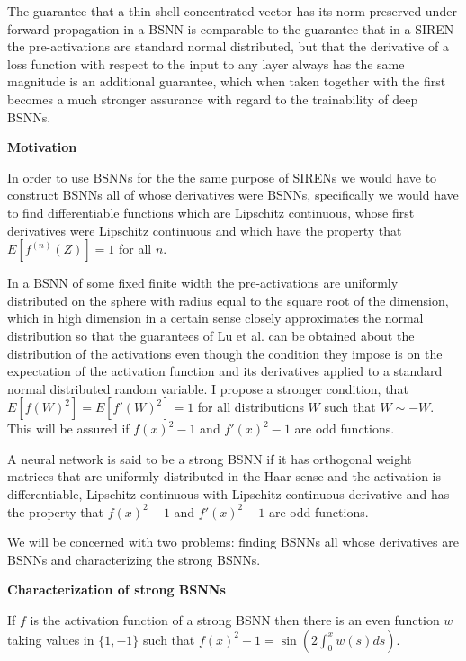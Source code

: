 \documentclass{letter}
\begin{document}
The guarantee that a thin-shell concentrated vector has its norm preserved under forward propagation in a BSNN is comparable to the guarantee that in a SIREN the pre-activations are standard normal distributed, but that the derivative of a loss function with respect to the input to any layer always has the same magnitude is an additional guarantee, which when taken together with the first becomes a much stronger assurance with regard to the trainability of deep BSNNs.

\begin{center}
{\bf Motivation}
\end{center}

In order to use BSNNs for the the same purpose of SIRENs we would have to construct BSNNs all of whose derivatives were BSNNs, specifically we would have to find differentiable functions which are Lipschitz continuous, whose first derivatives were Lipschitz continuous and which have the property that $E[f^{(n)}(Z)]=1$ for all $n$.

In a BSNN of some fixed finite width the pre-activations are uniformly distributed on the sphere with radius equal to the square root of the dimension, which in high dimension in a certain sense closely approximates the normal distribution so that the guarantees of Lu et al. can be obtained about the distribution of the activations even though the condition they impose is on the expectation of the activation function and its derivatives applied  to a standard normal distributed random variable. I propose a stronger condition, that $E[f(W)^2]=E[f'(W)^2]=1$ for all distributions $W$ such that $W \sim -W$. This will be assured if $f(x)^2-1$ and $f'(x)^2-1$ are odd functions.

\begin{definition}
A neural network is said to be a strong BSNN if it has orthogonal weight matrices that are uniformly distributed in the Haar sense and the activation is differentiable, Lipschitz continuous with Lipschitz continuous derivative and has the property that $f(x)^2-1$ and $f'(x)^2-1$ are odd functions.
\end{definition}

We will be concerned with two problems: finding BSNNs all whose derivatives are BSNNs and characterizing the strong BSNNs.

\begin{center}
{\bf Characterization of strong BSNNs}
\end{center}

\begin{theorem}
If $f$ is the activation function of a strong BSNN then there is an even function $w$ taking values in $\{1,-1\}$ such that $f(x)^2-1=\sin(2\int_0^x w(s)ds)$.
\end{theorem}
\end{document}
